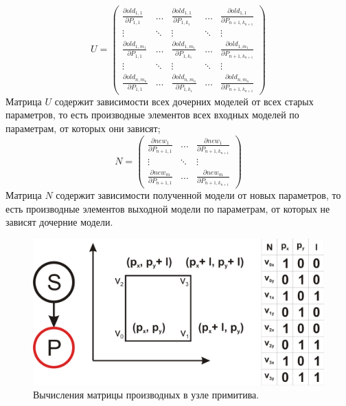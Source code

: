 \documentclass[a4paper,hidelinks,12pt]{article}
\begin{document}
\begin{equation*}
U = \left(
\begin{array}{ccccc}
\frac{\partial old_{1,1}} {\partial P_{1,1}} & \ldots & \frac{\partial old_{1,1}} {\partial P_{1,k_1}} & \ldots & \frac{\partial old_{1,1}} {\partial P_{n+1,k_{n+1}}}\\
\vdots & \ddots & \vdots & \ddots & \vdots\\
\frac{\partial old_{1,m_1}} {\partial P_{1,1}} & \ldots & \frac{\partial old_{1,m_1}} {\partial P_{1,k_1}} & \ldots & \frac{\partial old_{1,m_1}} {\partial P_{n+1,k_{n+1}}}\\
\vdots & \ddots & \vdots & \ddots & \vdots\\
\frac{\partial old_{n,m_n}} {\partial P_{1,1}} & \ldots & \frac{\partial old_{n,m_n}} {\partial P_{1,k_1}} & \ldots & \frac{\partial old_{n,m_n}} {\partial P_{n+1,k_{n+1}}}
\end{array}
\right)
\end{equation*}
Матрица $U$ содержит зависимости всех дочерних моделей от всех старых параметров, то есть производные элементов всех входных моделей по параметрам, от которых они зависят;
\begin{equation*}
N = \left(
\begin{array}{ccc}
\frac{\partial new_1} {\partial P_{n+1,1}} & \ldots & \frac{\partial new_1} {\partial P_{n+1,k_{n+1}}}\\
\vdots & \ddots & \vdots\\
\frac{\partial new_m} {\partial P_{n+1,1}} & \ldots & \frac{\partial new_m} {\partial P_{n+1,k_{n+1}}}
\end{array}
\right)
\end{equation*}
Матрица $N$ содержит зависимости полученной модели от новых параметров, то есть производные элементов выходной модели по параметрам, от которых не зависят дочерние модели.

\begin{figure}[H]
\begin{center}
	\includegraphics[width=15 cm]{primer1.png}
	\caption{Вычисления матрицы производных в узле примитива.}
 	\label{fig_p_1}
\end{center}
\end{figure}
\end{document}
